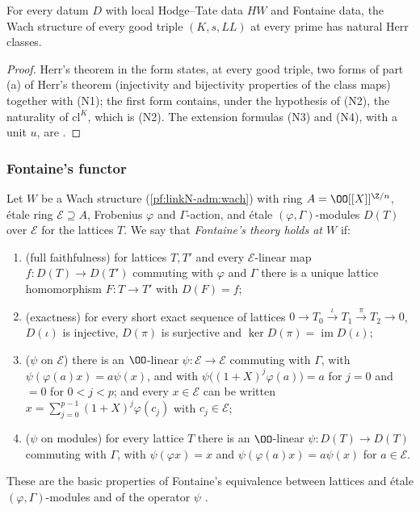\begin{proposition}\label{pf:linkN-sel:herr}
For every datum $D$ with local Hodge--Tate data $HW$ and Fontaine data, the Wach structure of every good triple $(K,s,\mathit{LL})$ at every
prime has natural Herr classes.
\end{proposition}

\begin{proof}
Herr's theorem in the form  states, at every good triple, two forms of part (a) of
Herr's theorem (injectivity and bijectivity properties of the class maps) together with (N1); the first form contains, under the hypothesis
of (N2), the naturality of $\mathrm{cl}^K$, which is (N2). The extension formulas (N3) and (N4), with a unit
$u$, are .
\end{proof}

\subsubsection{Fontaine's functor}

Let $W$ be a Wach structure (\cref{pf:linkN-adm:wach}) with ring $A=\OO[[X]]^{\Z/n}$, \'etale ring $\mathcal E\supseteq A$, Frobenius
$\varphi$ and $\Gamma$-action, and \'etale $(\varphi,\Gamma)$-modules $D(T)$ over $\mathcal E$ for the lattices $T$. We say that \emph{Fontaine's
theory holds at $W$} if:
\begin{enumerate}[label=(F\arabic*)]
\item (full faithfulness) for lattices $T,T'$ and every $\mathcal E$-linear map $f\colon D(T)\to D(T')$ commuting with $\varphi$ and $\Gamma$
there is a unique lattice homomorphism $F\colon T\to T'$ with $D(F)=f$;
\item (exactness) for every short exact sequence of lattices $0\to T_0\xrightarrow{\iota}T_1\xrightarrow{\pi}T_2\to0$, $D(\iota)$ is injective,
$D(\pi)$ is surjective and $\ker D(\pi)=\operatorname{im}D(\iota)$;
\item ($\psi$ on $\mathcal E$) there is an $\OO$-linear $\psi\colon\mathcal E\to\mathcal E$ commuting with $\Gamma$, with $\psi(\varphi(a)x)=a\psi(x)$,
and with $\psi\bigl((1+X)^j\varphi(a)\bigr)=a$ for $j=0$ and $=0$ for $0<j<p$; and every $x\in\mathcal E$ can be written
$x=\sum_{j=0}^{p-1}(1+X)^j\varphi(c_j)$ with $c_j\in\mathcal E$;
\item ($\psi$ on modules) for every lattice $T$ there is an $\OO$-linear $\psi\colon D(T)\to D(T)$ commuting with $\Gamma$, with $\psi(\varphi x)=x$
and $\psi(\varphi(a)x)=a\psi(x)$ for $a\in\mathcal E$.
\end{enumerate}
These are the basic properties of Fontaine's equivalence between lattices and \'etale $(\varphi,\Gamma)$-modules and of the operator $\psi$
\cite{Fontaine1990,Herr1998}.

